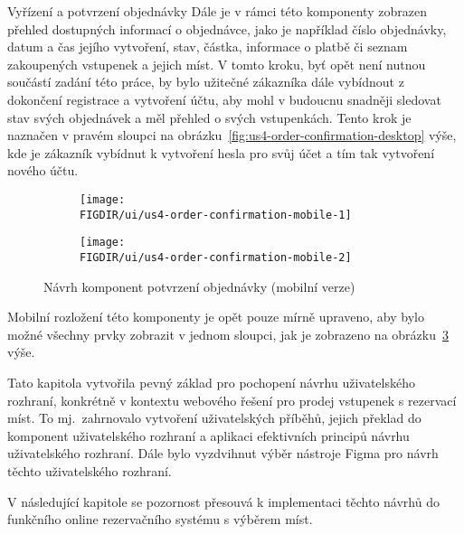 \begin{subsection}{Vyřízení a potvrzení objednávky}
    Dále je v rámci této komponenty zobrazen přehled dostupných informací o objednávce, jako je například číslo objednávky, datum a čas jejího vytvoření, stav, částka, informace o platbě či seznam zakoupených vstupenek a jejich míst.
    V tomto kroku, byť opět není nutnou součástí zadání této práce, by bylo užitečné zákazníka dále vybídnout z dokončení registrace a vytvoření účtu, aby mohl v budoucnu snadněji sledovat stav svých objednávek a měl přehled o svých vstupenkách.
    Tento krok je naznačen v pravém sloupci na obrázku~\ref{fig:us4-order-confirmation-desktop} výše, kde je zákazník vybídnut k vytvoření hesla pro svůj účet a tím tak vytvoření nového účtu.

    \begin{figure}[H]
        \centering
        \begin{subfigure}{0.4\textwidth}
            \texttt{[image: \\FIGDIR/ui/us4-order-confirmation-mobile-1]}
            \label{fig:us4-order-confirmation-mobile-1}
        \end{subfigure}
        \hfill
        \begin{subfigure}{0.4\textwidth}
            \texttt{[image: \\FIGDIR/ui/us4-order-confirmation-mobile-2]}
            \label{fig:us4-order-confirmation-mobile-2}
        \end{subfigure}

        \caption{Návrh komponent potvrzení objednávky (mobilní verze)}
        \label{fig:us4-order-confirmation-mobile}
    \end{figure}

    Mobilní rozložení této komponenty je opět pouze mírně upraveno, aby bylo možné všechny prvky zobrazit v jednom sloupci, jak je zobrazeno na obrázku~\ref{fig:us4-order-confirmation-mobile} výše.

    Tato kapitola vytvořila pevný základ pro pochopení návrhu uživatelského rozhraní, konkrétně v kontextu webového řešení pro prodej vstupenek s rezervací míst.
    To mj.\ zahrnovalo vytvoření uživatelských příběhů, jejich překlad do komponent uživatelského rozhraní a aplikaci efektivních principů návrhu uživatelského rozhraní.
    Dále bylo vyzdvihnut výběr nástroje Figma pro návrh těchto uživatelského rozhraní.

    V následující kapitole se pozornost přesouvá k implementaci těchto návrhů do funkčního online rezervačního systému s výběrem míst.
\end{subsection}
